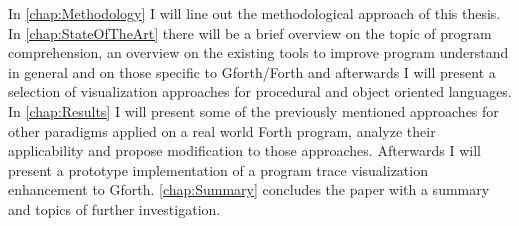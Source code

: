 In \autoref{chap:Methodology} I will line out the methodological approach of this thesis. In \autoref{chap:StateOfTheArt} there will be a brief overview on the topic of program comprehension, an overview on the existing tools to improve program understand in general and on those specific to Gforth/Forth and afterwards I will present a selection of visualization approaches for procedural and object oriented languages. In \autoref{chap:Results} I will present some of the previously mentioned approaches for other paradigms applied on a real world Forth program, analyze their applicability and propose modification to those approaches. Afterwards I will present a prototype implementation of a program trace visualization enhancement to Gforth. \autoref{chap:Summary} concludes the paper with a summary and topics of further investigation.

\begin{comment}
At first, the available information of a forth program is identified. The next step is to characterize the information and its necessity for program comprehension is investigated. The differences of forth and object oriented languages are summarized and then the applicability of existing analysis and visualization methods is presented. \hl{Since there is no standard implementation of object orientation if forth, this thesis won't take any object orientation implementation into account.}
The last part of this thesis investigates probable enhancements and modifications to existing methods and proposes new approaches.
After the conclusion, the thesis presents further suggestions to support program comprehension and further topics of research in this direction.
\end{comment}
